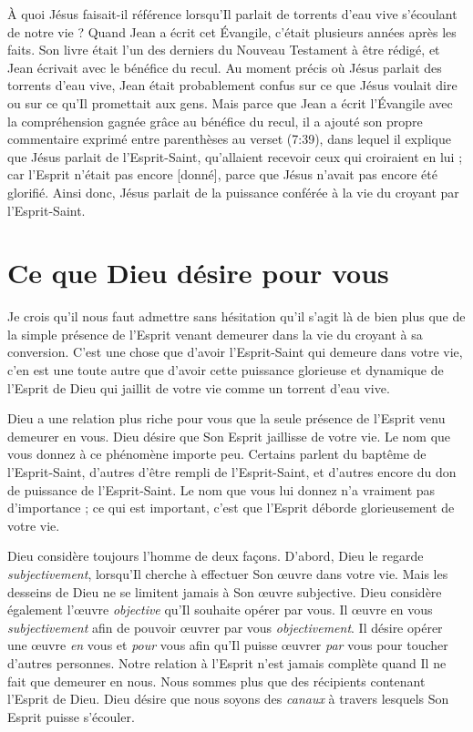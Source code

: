 À quoi Jésus faisait-il référence lorsqu'Il parlait de
 \Og torrents d'eau vive \Fg{} s'écoulant de notre vie ?
 Quand Jean a écrit cet Évangile, c'était plusieurs années après les faits.
 Son livre était l'un des derniers du Nouveau Testament à être rédigé,
 et Jean écrivait avec le bénéfice du recul. Au moment précis où Jésus parlait
 des torrents d'eau vive, Jean était probablement confus sur ce que
 Jésus voulait dire ou sur ce qu'Il promettait aux gens.
 Mais parce que Jean a écrit l'Évangile avec la compréhension gagnée grâce
 au bénéfice du recul, il a ajouté son propre commentaire exprimé entre
 parenthèses au verset (7:39), dans lequel il explique que Jésus
 parlait de l'Esprit-Saint, \Og qu'allaient recevoir ceux qui croiraient
 en lui ; car l'Esprit n'était pas encore [donné], parce que Jésus n'avait
 pas encore été glorifié. \Fg{}
 Ainsi donc, Jésus parlait de la puissance conférée à la vie du croyant
 par l'Esprit-Saint.


\section{Ce que Dieu d\'esire pour vous}

Je crois qu'il nous faut admettre sans hésitation qu'il s'agit là de bien
 plus que de la simple présence de l'Esprit venant demeurer dans la vie
 du croyant à sa conversion. C'est une chose que d'avoir l'Esprit-Saint
 qui demeure dans votre vie, c'en est une toute autre que d'avoir cette puissance
 glorieuse et dynamique de l'Esprit de Dieu qui jaillit de votre vie
 comme un torrent d'eau vive.

Dieu a une relation plus riche pour vous que la seule présence de l'Esprit
 venu demeurer en vous. Dieu désire que Son Esprit jaillisse
 de votre vie. Le nom que vous donnez à ce phénomène importe peu.
 Certains parlent du baptême de l'Esprit-Saint,
 d'autres d'être rempli de l'Esprit-Saint, et d'autres encore du don
 de puissance de l'Esprit-Saint. Le nom que vous lui donnez n'a vraiment
 pas d'im\-por\-tan\-ce ; ce qui est important, c'est que l'Esprit
 déborde glorieusement de votre vie.

Dieu considère toujours l'homme de deux façons. D'abord, Dieu le regarde
 \emph{subjectivement}, lorsqu'Il cherche à effectuer Son œuvre
 dans votre vie.
 Mais les desseins de Dieu ne se limitent jamais à Son œuvre subjective.
 Dieu considère également l'œuvre \emph{objective} qu'Il souhaite opérer
 par vous.
 Il œuvre en vous \emph{subjectivement} afin de pouvoir œuvrer par vous
 \emph{objectivement}. Il désire opérer une œuvre \emph{en} vous
 et \emph{pour} vous afin
 qu'Il puisse œuvrer \emph{par} vous pour toucher d'autres personnes.
 Notre relation à l'Esprit n'est jamais complète quand Il ne fait que
 demeurer en nous. Nous sommes plus que des récipients contenant
 l'Esprit de Dieu. Dieu désire que nous soyons des \emph{canaux} à travers
 lesquels Son Esprit puisse s'écouler.


